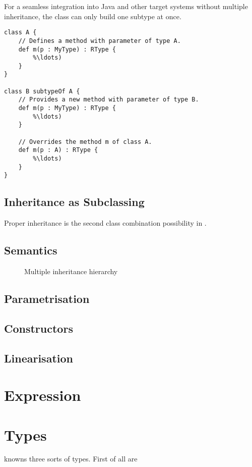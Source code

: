 For a seamless integration into Java and other target systems without multiple
inheritance, the class can only build one subtype at once.

\begin{lstlisting}[language=ooplss,caption=Subtyping in \ooplss,label="lst:subtypeOf"]
class A {
	// Defines a method with parameter of type A.
	def m(p : MyType) : RType {
		%\ldots)
	}
}

class B subtypeOf A {
	// Provides a new method with parameter of type B.
	def m(p : MyType) : RType {
		%\ldots)
	}

	// Overrides the method m of class A.
	def m(p : A) : RType {
		%\ldots)
	}
}
\end{lstlisting}

\section{Inheritance as Subclassing}
Proper inheritance is the second class combination possibility in \ooplss. 

\section{Semantics}
\begin{figure}
	\centering
	\caption{Multiple inheritance hierarchy}
	\label{fig:multiInherit}
\end{figure}

\section{Parametrisation}
\section{Constructors}
\section{Linearisation}



\chapter{Expression}

\chapter{Types}
\ooplss knowns three sorts of types. First of all are

